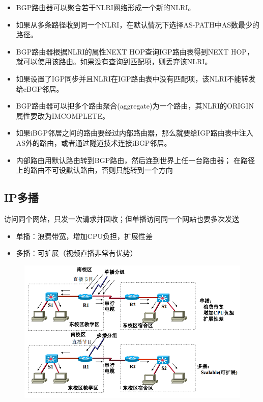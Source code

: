 \begin{itemize}
\item BGP路由器可以聚合若干NLRI网络形成一个新的NLRI。
\item 如果从多条路径收到同一个NLRI，在默认情况下选择AS-PATH中AS数最少的路径。
\item BGP路由器根据NLRI的属性NEXT HOP查询IGP路由表得到NEXT HOP， 就可以使用该路由。如果没有查询到匹配项，则丢弃该NLRI。
\item 如果设置了IGP同步并且NLRI在IGP路由表中没有匹配项，该NLRI不能转发给eBGP邻居。
\item BGP路由器可以把多个路由聚合(aggregate)为一个路由，其NLRI的ORIGIN属性要改为IMCOMPLETE。
\item 如果iBGP邻居之间的路由要经过内部路由器，那么就要给IGP路由表中注入AS外的路由，或者通过隧道技术连接iBGP邻居。
\item 内部路由用默认路由转到BGP路由，然后连到世界上任一台路由器；
在路径上的路由不可设默认路由，否则只能转到一个方向
\end{itemize}

\subsection{IP多播}
访问同个网站，只发一次请求并回收；但单播访问同一个网站也要多次发送
\begin{itemize}
\item 单播：浪费带宽，增加CPU负担，扩展性差
\item 多播：可扩展（视频直播非常有优势）
\end{itemize}
\begin{figure}[H]
	\centering
	\includegraphics[width=0.8\linewidth]{fig/multicast.png}
\end{figure}

